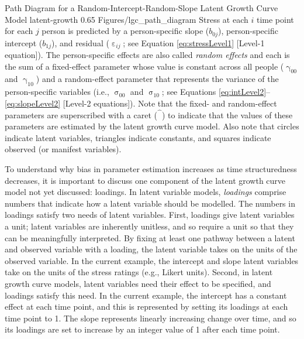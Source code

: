 \documentclass[
12pt, %
twoside,
english]{guelphthesis}
\begin{document}
\begin{apaFigure}
[portrait]
[samepage]
[-0.2cm]
{Path Diagram for a Random-Intercept-Random-Slope Latent Growth Curve Model}
{latent-growth}
{0.65}
{Figures/lgc_path_diagram}
{Stress at each $i$ time point for each $j$ person is predicted by a person-specific slope ($b_{0j}$), person-specific intercept ($b_{1j}$), and residual ($\upepsilon_{ij}$; see Equation \ref{eq:stressLevel1} [Level-1 equation]). The person-specific effects are also called \textit{random effects} and each is the sum of a fixed-effect parameter whose value is constant across all people ($\upgamma_{00}$ and $\upgamma_{10}$) and a random-effect parameter that represents the variance of the person-specific variables (i.e., $\upsigma_{00}$ and $\upsigma_{10}$; see Equations \ref{eq:intLevel2}--\ref{eq:slopeLevel2} [Level-2 equations]). Note that the fixed- and random-effect parameters are superscribed with a caret ($\hat{\phantom{\beta}}$) to indicate that the values of these parameters are estimated by the latent growth curve model. Also note that circles indicate latent variables, triangles indicate constants, and squares indicate observed (or manifest variables).}
\end{apaFigure}
To understand why bias in parameter estimation increases as time structuredness decreases, it is important to discuss one component of the latent growth curve model not yet discussed: loadings. In latent variable models, \emph{loadings} comprise numbers that indicate how a latent variable should be modelled. The numbers in loadings satisfy two needs of latent variables. First, loadings give latent variables a unit; latent variables are inherently unitless, and so require a unit so that they can be meaningfully interpreted. By fixing at least one pathway between a latent and observed variable with a loading, the latent variable takes on the units of the observed variable. In the current example, the intercept and slope latent variables take on the units of the stress ratings (e.g., Likert units). Second, in latent growth curve models, latent variables need their effect to be specified, and loadings satisfy this need. In the current example, the intercept has a constant effect at each time point, and this is represented by setting its loadings at each time point to 1. The slope represents linearly increasing change over time, and so its loadings are set to increase by an integer value of 1 after each time point.
\end{document}
